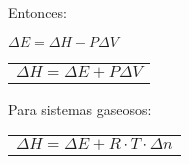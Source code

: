        Entonces:
        \begin{center}
            $\Delta E = \Delta H - P \Delta V$ \\[5pt]
            \begin{tabular}{| c |}
                \hline
                $\Delta H = \Delta E + P \Delta V $
            \end{tabular}
        \end{center}
        Para sistemas gaseosos:
        \begin{center} \begin{tabular}{| c |} \hline $\Delta H = \Delta E + R \cdot T \cdot \Delta n$ \end{tabular} \end{center}
